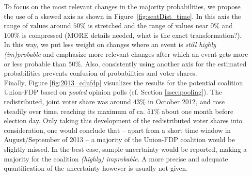 \documentclass[smallcondensed]{svjour3}     %
\begin{document}
To focus on the most relevant changes in the majority probabilities, we propose
the use of a skewed axis as shown in Figure~\ref{fig:seatDist_time}. In this axis
the range of values around $50\%$ is stretched and the range of values near
$0\%$ and $100\%$ is compressed (MORE details needed, what is the exact transformation?).
In this way, we put less weight on changes
where an event is {\it still highly (im)probable} and emphasize more relevant
changes after which an event gets more or less probable than $50\%$. Also,
consistently using another axis for the estimated probabilities prevents
confusion of probabilities and voter shares.\\

Finally, Figure \ref{fig:2013_cdufdp} visualizes the results for the potential
coalition Union-FDP based on \emph{pooled} opinion polls (cf. Section \ref{ssec:pooling}).
The redistributed, joint voter share was around $43\%$ in October 2012,
and rose steadily over time, reaching its maximum of ca. $51\%$ about one month
before election day.
Only taking this development of the redistributed voter shares into
consideration, one would conclude that -- apart from a short
time window in August/September of 2013 -- a majority of the Union-FDP
coalition would be slightly missed.
In the best case, sample uncertainty would be reported, making
a majority for the coalition {\it (highly) improbable}. A more
precise and adequate quantification of the uncertainty however is usually not given.
\end{document}
